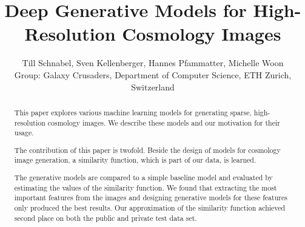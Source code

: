 \documentclass[10pt,conference,compsocconf]{IEEEtran}
\newcommand\TODO[1]{\textcolor{red}{#1}} %
\begin{document}
\title{Deep Generative Models for High-Resolution Cosmology Images}

\author{Till Schnabel, Sven Kellenberger, Hannes Pfammatter, Michelle Woon \\Group: Galaxy Crusaders, Department of Computer Science, ETH Zurich, Switzerland}

\maketitle

\begin{abstract}
This paper explores various machine learning models for generating sparse, high-resolution cosmology images. We describe these models and our motivation for their usage.

The contribution of this paper is twofold. Beside the design of models for cosmology image generation, a similarity function, which is part of our data, is learned.

The generative models are compared to a simple baseline model and evaluated by estimating the values of the similarity function. We found that extracting the most important features from the images and designing generative models for these features only produced the best results. Our approximation of the similarity function achieved second place on both the public and private test data set.




\end{abstract}
\end{document}
